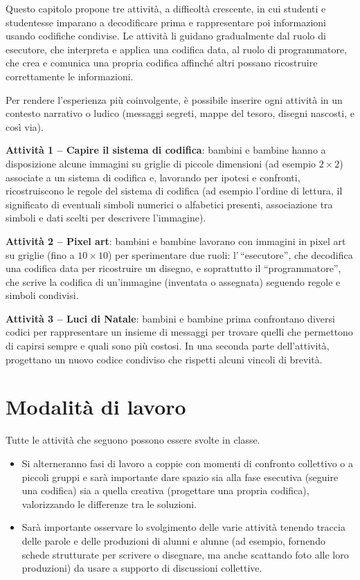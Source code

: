 Questo capitolo propone tre attività, a difficoltà crescente, in cui studenti e studentesse imparano a decodificare prima e rappresentare poi informazioni usando codifiche condivise. Le attività li guidano gradualmente dal ruolo di esecutore, che interpreta e applica una codifica data, al ruolo di programmatore, che crea e comunica una propria codifica affinché altri possano ricostruire correttamente le informazioni.

Per rendere l'esperienza più coinvolgente, è possibile inserire ogni attività in un contesto narrativo o ludico (messaggi segreti, mappe del tesoro, disegni nascosti, e così via).

\textbf{Attività 1 -- Capire il sistema di codifica}: bambini e bambine hanno a disposizione alcune immagini su griglie di piccole dimensioni (ad esempio \(2 \times 2\)) associate a un sistema di codifica e, lavorando per ipotesi e confronti, ricostruiscono le regole del sistema di codifica (ad esempio l'ordine di lettura, il significato di eventuali simboli numerici o alfabetici presenti, associazione tra simboli e dati scelti per descrivere l'immagine).

\textbf{Attività 2 -- Pixel art}: bambini e bambine lavorano con immagini in pixel art su griglie (fino a \(10 \times 10\)) per sperimentare due ruoli: l'\,``esecutore'', che decodifica una codifica data per ricostruire un disegno, e soprattutto il ``programmatore'', che scrive la codifica di un'immagine (inventata o assegnata) seguendo regole e simboli condivisi.

\textbf{Attività 3 -- Luci di Natale}: bambini e bambine prima confrontano diversi codici per rappresentare un insieme di messaggi per trovare quelli che permettono di capirsi sempre e quali sono più costosi. In una seconda parte dell'attività, progettano un nuovo codice condiviso che rispetti alcuni vincoli di brevità.

\section{Modalità di lavoro }\label{modalituxe0-di-lavoro-2}

Tutte le attività che seguono possono essere svolte in classe.

\begin{itemize}
\item
  Si alterneranno fasi di lavoro a coppie con momenti di confronto collettivo o a piccoli gruppi e sarà importante dare spazio sia alla fase esecutiva (seguire una codifica) sia a quella creativa (progettare una propria codifica), valorizzando le differenze tra le soluzioni.
\item
  Sarà importante osservare lo svolgimento delle varie attività tenendo traccia delle parole e delle produzioni di alunni e alunne (ad esempio, fornendo schede strutturate per scrivere o disegnare, ma anche scattando foto alle loro produzioni) da usare a supporto di discussioni collettive.
\end{itemize}

